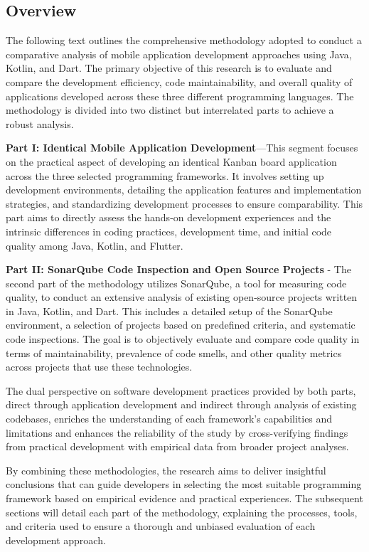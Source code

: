 \subsection{Overview}
The following text outlines the comprehensive methodology adopted to conduct a comparative analysis of mobile application development approaches using Java, Kotlin, and Dart. The primary objective of this research is to evaluate and compare the development efficiency, code maintainability, and overall quality of applications developed across these three different programming languages. The methodology is divided into two distinct but interrelated parts to achieve a robust analysis.
\par
\textbf{Part I: Identical Mobile Application Development}—This segment focuses on the practical aspect of developing an identical Kanban board application across the three selected programming frameworks. It involves setting up development environments, detailing the application features and implementation strategies, and standardizing development processes to ensure comparability. This part aims to directly assess the hands-on development experiences and the intrinsic differences in coding practices, development time, and initial code quality among Java, Kotlin, and Flutter.
\par
\textbf{Part II: SonarQube Code Inspection and Open Source Projects} - The second part of the methodology utilizes SonarQube, a tool for measuring code quality, to conduct an extensive analysis of existing open-source projects written in Java, Kotlin, and Dart. This includes a detailed setup of the SonarQube environment, a selection of projects based on predefined criteria, and systematic code inspections. The goal is to objectively evaluate and compare code quality in terms of maintainability, prevalence of code smells, and other quality metrics across projects that use these technologies.
\par
The dual perspective on software development practices provided by both parts, direct through application development and indirect through analysis of existing codebases, enriches the understanding of each framework's capabilities and limitations and enhances the reliability of the study by cross-verifying findings from practical development with empirical data from broader project analyses.
\par
By combining these methodologies, the research aims to deliver insightful conclusions that can guide developers in selecting the most suitable programming framework based on empirical evidence and practical experiences. The subsequent sections will detail each part of the methodology, explaining the processes, tools, and criteria used to ensure a thorough and unbiased evaluation of each development approach.
